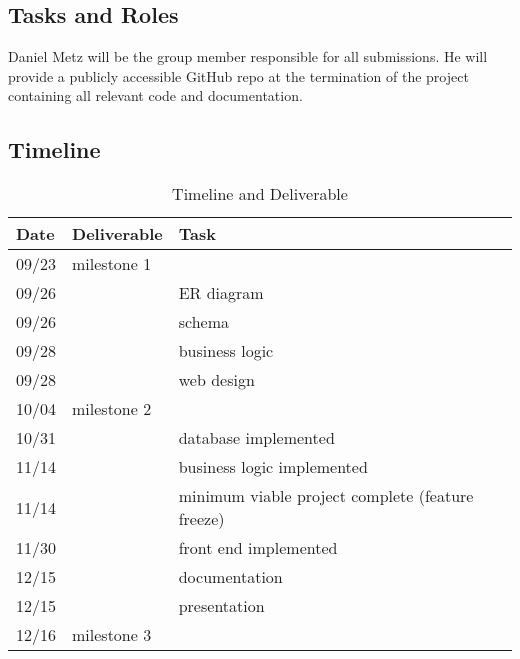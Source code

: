 \subsection{Tasks and Roles}

Daniel Metz will be the group member responsible for all submissions. He will
provide a publicly accessible GitHub repo at the termination of the project
containing all relevant code and documentation.

\subsection{Timeline}

\begin{table}[h] \centering
\begin{tabular}{lll} \toprule
Date & Deliverable & Task \\ \midrule
09/23 & milestone 1  \\ \midrule
09/26 & ~ & ER diagram \\
09/26 & ~ & schema \\
09/28 & ~ & business logic \\
09/28 & ~ & web design \\ \midrule
10/04 & milestone 2  \\ \midrule
10/31 & ~ & database implemented \\
11/14 & ~ & business logic implemented \\
11/14 & ~ & minimum viable project complete (feature freeze) \\
11/30 & ~ & front end implemented \\
12/15 & ~ & documentation \\
12/15 & ~ & presentation \\ \midrule
12/16 & milestone 3 \\
\bottomrule
\end{tabular}
\caption{Timeline and Deliverable}
\end{table}